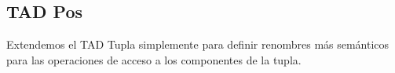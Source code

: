 \subsection{TAD Pos}

Extendemos el TAD Tupla simplemente para definir renombres más semánticos para las operaciones de acceso a los componentes de la tupla.

\begin{tad}{}



\tadOtrasOperaciones
{}


\end{tad}
